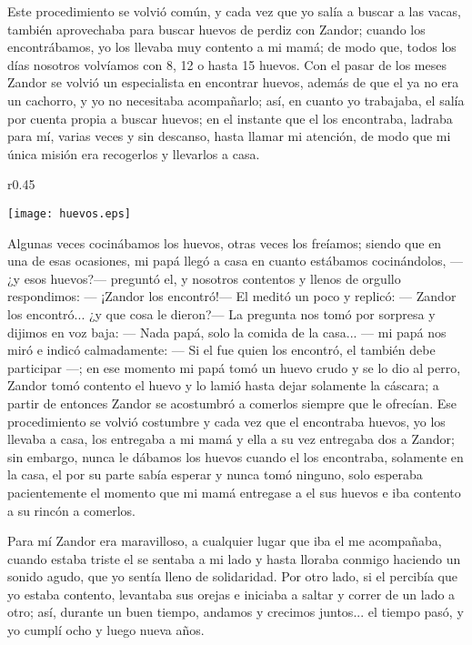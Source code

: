 Este procedimiento se volvió común, y cada vez que yo salía a buscar a las vacas, también aprovechaba para buscar huevos de perdiz con Zandor; cuando los encontrábamos,  yo los llevaba muy contento a mi mamá; de modo que, todos los días nosotros volvíamos con 8, 12 o hasta 15 huevos.
Con el pasar de los meses Zandor se volvió un especialista en encontrar huevos, además de que el ya no era un cachorro, y yo no necesitaba acompañarlo; así, en cuanto yo trabajaba, el salía por cuenta propia a buscar huevos; en el instante que el los encontraba, ladraba para mí, varias veces y sin descanso, hasta llamar mi atención, de modo que mi única misión era recogerlos y llevarlos a casa.
\begin{wrapfigure}{r}{0.45\textwidth}
  \begin{center}
  \vspace{-20pt}
    \texttt{[image: huevos.eps]}
  \end{center}
  \vspace{-20pt}
\end{wrapfigure}
Algunas veces cocinábamos los huevos, otras veces los freíamos; siendo que en una de esas ocasiones, mi papá llegó a casa en cuanto estábamos cocinándolos, --- ¿y esos huevos?--- preguntó el, 
y nosotros contentos y llenos de orgullo respondimos: 
--- ¡Zandor los encontró!---
El meditó un poco y replicó: 
--- Zandor los encontró... ¿y que cosa le dieron?--- 
La pregunta nos tomó por sorpresa y dijimos en voz baja: 
--- Nada papá, solo la comida de la casa... --- mi papá nos miró e indicó calmadamente: 
--- Si el fue quien los encontró, el también debe participar ---;
en ese momento mi papá tomó un huevo crudo y se lo dio al perro, Zandor tomó contento el huevo y lo lamió hasta dejar solamente la cáscara; a partir de entonces Zandor se acostumbró a comerlos siempre que le ofrecían. Ese procedimiento se volvió costumbre y cada vez que el encontraba huevos, yo los llevaba a casa, los entregaba a mi mamá y ella a su vez entregaba dos a Zandor; sin embargo, nunca le dábamos los huevos cuando el los encontraba, solamente en la casa, el por su parte sabía esperar y nunca tomó ninguno, solo esperaba pacientemente el momento que mi mamá entregase a el sus huevos e iba contento a su rincón a comerlos.


Para mí Zandor era maravilloso, a cualquier lugar que iba el me acompañaba, cuando estaba triste el se sentaba a mi lado y hasta lloraba conmigo haciendo un sonido agudo, que yo sentía lleno de solidaridad.
Por otro lado, si el percibía que yo estaba contento, levantaba sus orejas e iniciaba a saltar y correr de un lado a otro; así, durante un buen tiempo, andamos y crecimos juntos... el tiempo pasó, y yo cumplí ocho y luego nueva años.

